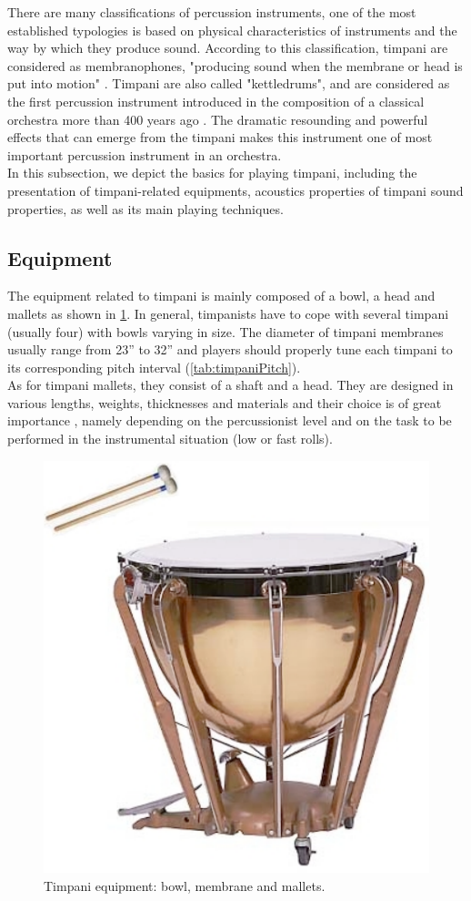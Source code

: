There are many classifications of percussion instruments, one of the most established typologies is based on physical characteristics of instruments and the way by which they produce sound. According to this classification, timpani are considered as membranophones, "producing sound when the membrane or head is put into motion" . Timpani are also called "kettledrums", and are considered as the first percussion instrument introduced in the composition of a classical orchestra more than 400 years ago . The dramatic resounding and powerful effects that can emerge from the timpani makes this instrument one of most important percussion instrument in an orchestra.\\

In this subsection, we depict the basics for playing timpani, including the presentation of timpani-related equipments, acoustics properties of timpani sound properties, as well as its main playing techniques.


		\subsection{Equipment}
		\label{subsec:Analysis_TimpaniBasics_Equipment}

The equipment related to timpani is mainly composed of a bowl, a head and mallets as shown in \myfigname \ref{fig:timpaniEquipment}. In general, timpanists have to cope with several timpani (usually four) with bowls varying in size. The diameter of timpani membranes usually range from 23'' to 32''  and players should properly tune each timpani to its corresponding pitch interval (\mytabname \ref{tab:timpaniPitch}).\\

As for timpani mallets, they consist of a shaft and a head. They are designed in various lengths, weights, thicknesses and materials  and their choice is of great importance , namely depending on the percussionist level and on the task to be performed in the instrumental situation (low or fast rolls).

\begin{figure}%
	\begin{center}
		\includegraphics[width=0.4\columnwidth]{Chapters/4/Pics/Pdf/timpaniEquipment.pdf}
	\end{center}
	\vspace{-0.5cm}
	\caption[Timpani equipment]{Timpani equipment: bowl, membrane and mallets.}
	\label{fig:timpaniEquipment}
\end{figure}

